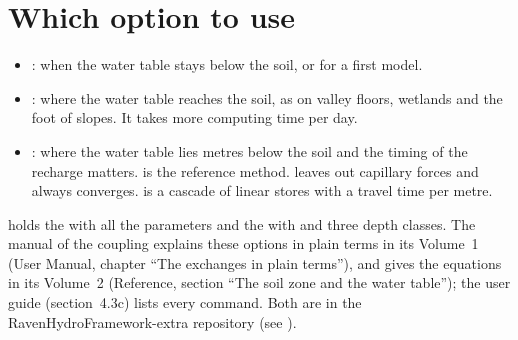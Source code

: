 \section{Which option to use}
\begin{itemize}
\item {}: when the water table stays below the soil, or for a first model.
\item {}: where the water table reaches the soil, as on valley floors, wetlands and the foot of slopes. It
  takes more computing time per day.
\item {}: where the water table lies metres below the soil and the timing of the recharge matters.
   is the reference method.  leaves out capillary forces and always converges.  is a
  cascade of linear stores with a travel time per metre.
\end{itemize}
 holds the  with all the parameters and the  with  and three
depth classes. The manual of the coupling explains these options in plain terms in its Volume~1 (User Manual, chapter
``The exchanges in plain terms''), and gives the equations in its Volume~2 (Reference, section ``The soil zone and the
water table''); the user guide (section~4.3c) lists every  command. Both are in the
RavenHydroFramework-extra repository (see ).
